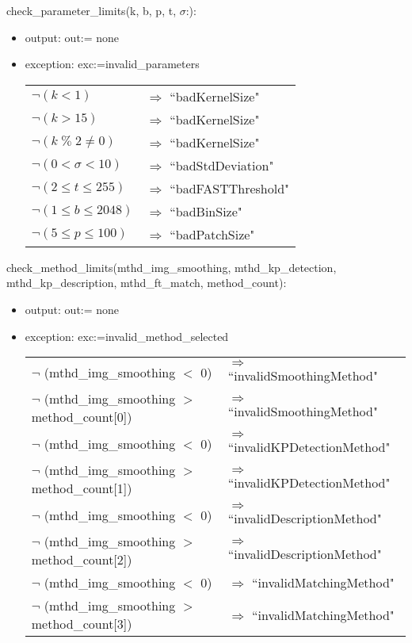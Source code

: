 \documentclass[12pt, titlepage]{article}
\begin{document}
\noindent check\_parameter\_limits(k, b, p, t, $\sigma$:):
\begin{itemize}
  \item output: out:= none
  \item exception: exc:=invalid\_parameters\
  \noindent \begin{longtable*}[l]{l l} 
    $\neg (k < 1)$ & $\Rightarrow$ ``badKernelSize"\\
    $\neg (k > 15)$ & $\Rightarrow$ ``badKernelSize"\\
    $\neg (k \; \% \; 2 \neq 0)$ & $\Rightarrow$ ``badKernelSize"\\
    $\neg (0 < \sigma < 10)$ & $\Rightarrow$ ``badStdDeviation"\\
    $\neg (2 \leq t \leq 255)$ & $\Rightarrow$ ``badFASTThreshold"\\
    $\neg (1 \leq b \leq 2048)$ & $\Rightarrow$ ``badBinSize"\\
    $\neg (5 \leq p \leq 100)$ & $\Rightarrow$ ``badPatchSize"\\
    \end{longtable*}
\end{itemize}


\noindent check\_method\_limits(mthd\_img\_smoothing, 
mthd\_kp\_detection, mthd\_kp\_description, mthd\_ft\_match, method\_count):
\begin{itemize}
  \item output: out:= none
  \item exception: exc:=invalid\_method\_selected\
  \noindent \begin{longtable*}[l]{l l} 
    $\neg$ (mthd\_img\_smoothing $<$ 0) & $\Rightarrow$ ``invalidSmoothingMethod"\\
    $\neg$ (mthd\_img\_smoothing $>$ method\_count[0]) & $\Rightarrow$ ``invalidSmoothingMethod"\\
    $\neg$ (mthd\_img\_smoothing $<$ 0) & $\Rightarrow$ ``invalidKPDetectionMethod"\\
    $\neg$ (mthd\_img\_smoothing $>$ method\_count[1]) & $\Rightarrow$ ``invalidKPDetectionMethod"\\
    $\neg$ (mthd\_img\_smoothing $<$ 0) & $\Rightarrow$ ``invalidDescriptionMethod"\\
    $\neg$ (mthd\_img\_smoothing $>$ method\_count[2]) & $\Rightarrow$ ``invalidDescriptionMethod"\\
    $\neg$ (mthd\_img\_smoothing $<$ 0) & $\Rightarrow$ ``invalidMatchingMethod"\\
    $\neg$ (mthd\_img\_smoothing $>$ method\_count[3]) & $\Rightarrow$ ``invalidMatchingMethod"\\
    \end{longtable*}
\end{itemize}
\end{document}
